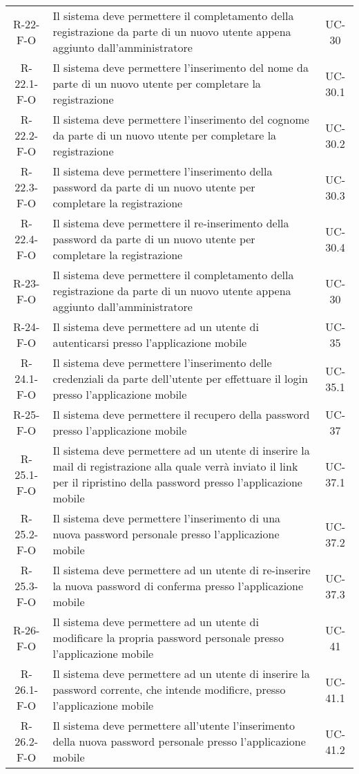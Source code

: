\begin{longtable}{ c C{9.5cm} c }
    R-22-F-O & Il sistema deve permettere il completamento della registrazione da parte di un nuovo utente appena aggiunto dall'amministratore& UC- 30\\
    R-22.1-F-O & Il sistema deve permettere l'inserimento del nome da parte di un nuovo utente per completare la registrazione& UC- 30.1\\
    R-22.2-F-O & Il sistema deve permettere l'inserimento del cognome da parte di un nuovo utente per completare la registrazione& UC- 30.2\\
    R-22.3-F-O & Il sistema deve permettere l'inserimento della password da parte di un nuovo utente per completare la registrazione& UC- 30.3\\
    R-22.4-F-O & Il sistema deve permettere il re-inserimento della password da parte di un nuovo utente per completare la registrazione& UC- 30.4\\
    R-23-F-O & Il sistema deve permettere il completamento della registrazione da parte di un nuovo utente appena aggiunto dall'amministratore& UC- 30\\
    R-24-F-O & Il sistema deve permettere ad un utente di autenticarsi presso l'applicazione mobile& UC-35\\
    R-24.1-F-O & Il sistema deve permettere l'inserimento delle credenziali da parte dell'utente per effettuare il login presso l'applicazione mobile& UC-35.1\\
    R-25-F-O & Il sistema deve permettere il recupero della password presso l'applicazione mobile& UC-37\\
    R-25.1-F-O & Il sistema deve permettere ad un utente di inserire la mail di registrazione alla quale verrà inviato il link per il ripristino della password presso l'applicazione mobile& UC-37.1\\
    R-25.2-F-O & Il sistema deve permettere l'inserimento di una nuova password personale presso l'applicazione mobile& UC-37.2\\
    R-25.3-F-O & Il sistema deve permettere ad un utente di re-inserire la nuova password di conferma presso l'applicazione mobile& UC-37.3\\
    R-26-F-O & Il sistema deve permettere ad un utente di modificare la propria password personale presso l'applicazione mobile& UC-41\\
    R-26.1-F-O & Il sistema deve permettere ad un utente di inserire la password corrente, che intende modificre, presso l'applicazione mobile& UC-41.1\\
    R-26.2-F-O & Il sistema deve permettere all'utente l'inserimento della nuova password personale presso l'applicazione mobile& UC-41.2\\

\end{longtable}
